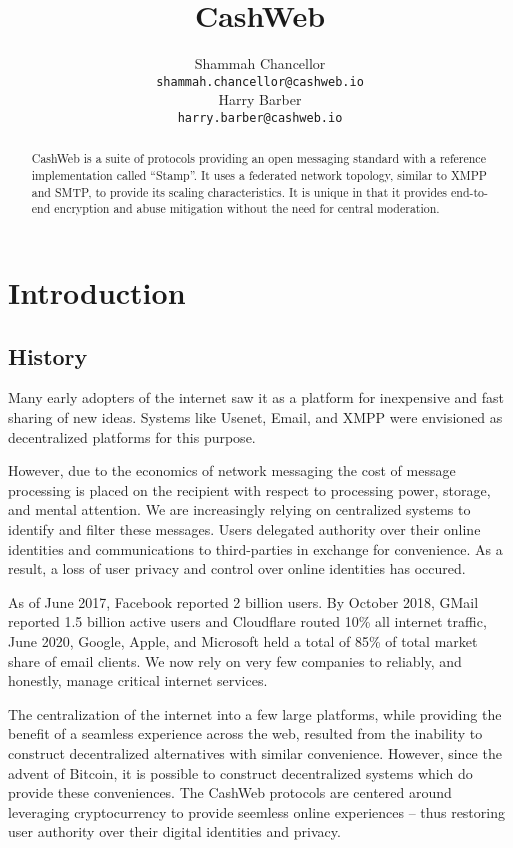 \documentclass{article}
\title{CashWeb}
\author{
 Shammah Chancellor \\
 \texttt{shammah.chancellor@cashweb.io} \\
 \And
 Harry Barber \\
 \texttt{harry.barber@cashweb.io} \\
}
\begin{document}
\maketitle

\begin{abstract}
CashWeb is a suite of protocols providing an open messaging standard with a reference implementation called ``Stamp''. It uses a federated network topology, similar to XMPP and SMTP, to provide its scaling characteristics. It is unique in that it provides end-to-end encryption and abuse mitigation without the need for central moderation.
\end{abstract}

\section{Introduction}

\subsection{History}

Many early adopters of the internet saw it as a platform for inexpensive and fast sharing of new ideas. Systems like Usenet\cite{rfc5536}\cite{rfc5537}, Email\cite{rfc5322}\cite{rfc1939}\cite{rfc5321}\cite{rfc4551}, and XMPP\cite{rfc3920}\cite{rfc3921}\cite{rfc3922}\cite{rfc3923} were envisioned as decentralized platforms for this purpose.

However, due to the economics of network messaging the cost of message processing is placed on the recipient with respect to processing power, storage, and mental attention. We are increasingly relying on centralized systems to identify and filter these messages. Users delegated authority over their online identities and communications to third-parties in exchange for convenience. As a result, a loss of user privacy and control over online identities has occured.

As of June 2017, Facebook reported 2 billion users. By October 2018, GMail reported 1.5 billion active users\cite{gmail2018} and Cloudflare routed 10\% all internet traffic\cite{cloudflare2018}, June 2020, Google, Apple, and Microsoft held a total of 85\% of total market share of email clients\cite{emailshare2020}. We now rely on very few companies to reliably, and honestly, manage critical internet services.

The centralization of the internet into a few large platforms, while providing the benefit of a seamless experience across the web, resulted from the inability to construct decentralized alternatives with similar convenience. However, since the advent of Bitcoin, it is possible to construct decentralized systems which do provide these conveniences. The CashWeb protocols are centered around leveraging cryptocurrency to provide seemless online experiences -- thus restoring user authority over their digital identities and privacy. 
\end{document}
